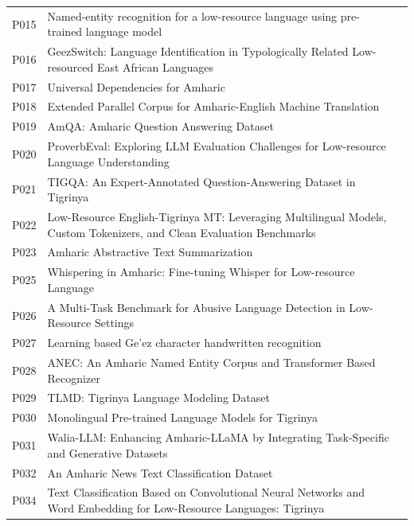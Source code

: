 \documentclass[sn-mathphys-num]{sn-jnl}
\theoremstyle{thmstyleone}
\theoremstyle{thmstyletwo}
\theoremstyle{thmstylethree}
\begin{document}
\begin{appendices}
\begin{longtable}{@{}p{1.1cm}p{8.5cm}p{2.3cm}@{}}
P015 & Named-entity recognition for a low-resource language using pre-trained language model & \citep{yohannes_named-entity_2022} \\
P016 & GeezSwitch: Language Identification in Typologically Related Low-resourced East African Languages & \citep{gaim_geezswitch_2022} \\
P017 & Universal Dependencies for Amharic & \citep{seyoum_universal_2018} \\
P018 & Extended Parallel Corpus for Amharic-English Machine Translation & \citep{gezmu_extended_2022} \\
P019 & AmQA: Amharic Question Answering Dataset & \citep{abedissa_amqa_2023} \\
P020 & ProverbEval: Exploring LLM Evaluation Challenges for Low-resource Language Understanding & \citep{azime_proverbeval_2024} \\
P021 & TIGQA: An Expert-Annotated Question-Answering Dataset in Tigrinya & \citep{teklehaymanot_tigqa_2024} \\
P022 & Low-Resource English-Tigrinya MT: Leveraging Multilingual Models, Custom Tokenizers, and Clean Evaluation Benchmarks & \citep{teklehaymanot_lowresource_2025} \\
P023 & Amharic Abstractive Text Summarization & \citep{zaki_amharic_2020} \\
P025 & Whispering in Amharic: Fine-tuning Whisper for Low-resource Language & \citep{gete_whispering_2025} \\
P026 & A Multi-Task Benchmark for Abusive Language Detection in Low-Resource Settings & \citep{gaim_multitask_2025} \\
P027 & Learning based Ge'ez character handwritten recognition & \citep{yimer_learning_2024} \\
P028 & ANEC: An Amharic Named Entity Corpus and Transformer Based Recognizer & \citep{jibril_anec_2022} \\
P029 & TLMD: Tigrinya Language Modeling Dataset & \citep{gaim_tlmd_2021} \\
P030 & Monolingual Pre-trained Language Models for Tigrinya & \citep{gaim_monolingual_2021} \\
P031 & Walia-LLM: Enhancing Amharic-LLaMA by Integrating Task-Specific and Generative Datasets & \citep{azime_waliallm_2024} \\
P032 & An Amharic News Text Classification Dataset & \citep{azime_amharic_2021} \\
P034 & Text Classification Based on Convolutional Neural Networks and Word Embedding for Low-Resource Languages: Tigrinya & \citep{fesseha_text_2021} \\

\end{longtable}
\end{appendices}
\end{document}
